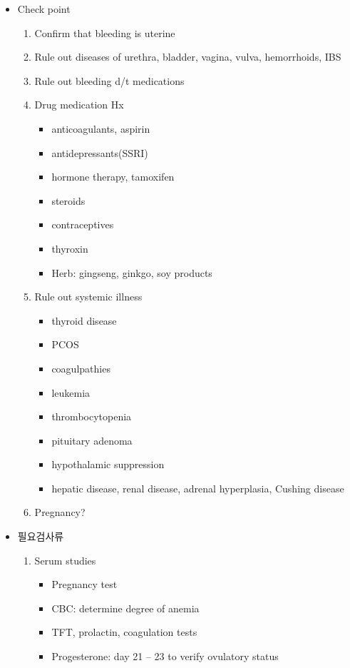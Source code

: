{
\begin{itemize}\tightlist
\item Check point 
	\begin{enumerate}\tightlist
	\item Confirm that bleeding is uterine 
	\item Rule out diseases of urethra, bladder, vagina, vulva, hemorrhoids,  IBS
	\item Rule out bleeding d/t medications  
	\item Drug medication Hx
		\begin{itemize}\tightlist
		\item  anticoagulants, aspirin 
		\item  antidepressants(SSRI) 
		\item   hormone therapy, tamoxifen  
		\item  steroids
		\item  contraceptives 
		\item  thyroxin  
		\item   Herb: gingseng, ginkgo, soy products  
		\end{itemize}
	\item Rule out systemic illness           
		\begin{itemize}\tightlist
		\item  thyroid disease  
		\item   PCOS
		\item  coagulpathies
		\item  leukemia 
		\item   thrombocytopenia  
		\item  pituitary adenoma
		\item   hypothalamic suppression 
		\item  hepatic disease, renal disease, adrenal hyperplasia, Cushing disease  
		\end{itemize}
	\item Pregnancy?
	\end{enumerate}
\item 필요검사류
	\begin{enumerate}\tightlist
	\item  Serum studies
		\begin{itemize}\tightlist
		\item  Pregnancy test 
		\item  CBC: determine degree of anemia 
		\item  TFT, prolactin, coagulation tests 
		\item  Progesterone: day 21 – 23 to verify ovulatory status

\end{itemize}
\end{enumerate}
\end{itemize}}
